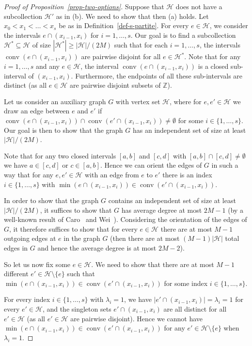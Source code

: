 \documentclass[11pt]{article}
\theoremstyle{definition}
\numberwithin{equation}{section}
\numberwithin{figure}{section}
\newcommand{\su}{\subseteq}
\newcommand{\sm}{\setminus}
\newcommand{\Z}{\mathbb{Z}}
\newcommand{\HH}{\mathcal{H}}
\newcommand{\conv}{\operatorname{conv}}
\begin{document}
\begin{proof}[Proof of Proposition~\ref{prop-two-options}]
Suppose that $\HH$ does not have a subcollection $\HH'$ as in (b). We need to show that then (a) holds. Let $x_0<x_1<\dots<x_s$ be as in Definition~\ref{def-s-partite}. For every $e\in \HH$, we consider the intervals $e\cap (x_{i-1},x_i)$ for $i=1,\dots,s$. Our goal is to find a subcollection $\HH^*\su \HH$ of size $|\HH^*|\ge |\HH|/(2M)$ such that for each $i=1,\dots,s$, the intervals $\conv(e\cap (x_{i-1},x_i))$ are pairwise disjoint for all $e\in \HH^*$. Note that for any $i=1,\dots,s$ and any $e\in \HH$, the interval $\conv(e\cap (x_{i-1},x_i))$ is a closed sub-interval of $(x_{i-1},x_i)$. Furthermore, the endpoints of all these sub-intervals are distinct (as all $e\in \HH$ are pairwise disjoint subsets of $\Z$).

Let us consider an auxiliary graph $G$ with vertex set $\HH$, where for $e,e'\in\HH$ we draw an edge between $e$ and $e'$ if $\conv(e\cap (x_{i-1},x_i))\cap \conv(e'\cap (x_{i-1},x_i))\ne \emptyset$ for some $i\in\{1,\dots,s\}$. Our goal is then to show that the graph $G$ has an independent set of size at least $|\HH|/(2M)$.

Note that for any two closed intervals $[a,b]$ and $[c,d]$ with $[a,b]\cap [c,d]\ne \emptyset$ we have $a\in [c,d]$ or $c\in [a,b]$. Hence we can orient the edges of $G$ in such a way that for any $e,e'\in\HH$ with an edge from $e$ to $e'$ there is an index $i\in\{1,\dots,s\}$ with $\min(e\cap (x_{i-1},x_i))\in \conv(e'\cap (x_{i-1},x_i))$.

In order to show that the graph $G$ contains an independent set of size at least $|\HH|/(2M)$, it suffices to show that $G$ has average degree at most $2M-1$ (by a well-known result of Caro~\cite{Caro} and Wei~\cite{Wei}). Considering the orientation of the edges of $G$, it therefore suffices to show that for every $e\in \HH$ there are at most $M-1$ outgoing edges at $e$ in the graph $G$ (then there are at most $(M-1)|\HH|$ total edges in $G$ and hence the average degree is at most $2M-2$).

So let us now fix some $e\in \HH$. We need to show that there are at most $M-1$ different $e'\in\HH\sm\{e\}$ such that $\min(e\cap (x_{i-1},x_i))\in \conv(e'\cap (x_{i-1},x_i))$ for some index $i\in\{1,\dots,s\}$. 

For every index $i\in\{1,\dots,s\}$ with $\lambda_i=1$, we have $|e'\cap (x_{i-1},x_i)|=\lambda_i=1$ for every $e'\in \HH$, and the singleton sets $e'\cap (x_{i-1},x_i)$ are all distinct for all $e'\in \HH$ (as all $e'\in \HH$ are pairwise disjoint). Hence we cannot have $\min(e\cap (x_{i-1},x_i))\in \conv(e'\cap (x_{i-1},x_i))$ for any $e'\in \HH\sm\{e\}$ when $\lambda_i=1$.


\end{proof}
\end{document}
